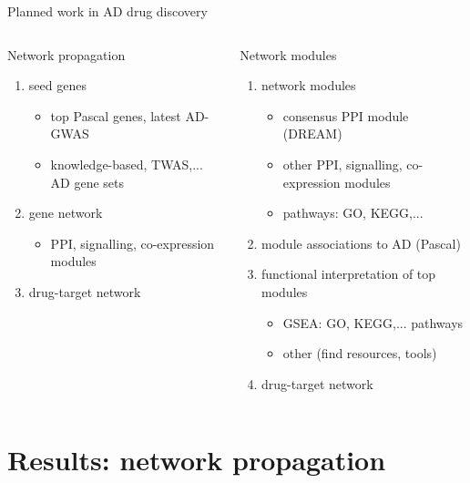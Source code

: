 \documentclass[aspectratio=169]{beamer}
\begin{document}
\begin{frame}[label=plans]{Planned work in AD drug discovery}
\begin{columns}[t]
\begin{column}{0.5\textwidth}
  Network propagation
\begin{enumerate}
  \item seed genes
  \begin{itemize}
    \item \alert{top Pascal genes, latest AD-GWAS}
    \item knowledge-based, TWAS,... AD gene sets
  \end{itemize}
  \item gene network
  \begin{itemize}
    \item PPI, signalling, co-expression modules
  \end{itemize}
  \item drug-target network
\end{enumerate}
\end{column}

\begin{column}{0.5\textwidth}
  Network modules
\begin{enumerate}
  \item network modules
  \begin{itemize}
    \item \alert{consensus PPI module (DREAM)}
    \item other PPI, signalling, co-expression modules
    \item \alert{pathways: GO, KEGG,...}
  \end{itemize}
  \item \alert{module associations to AD (Pascal)}
  \item functional interpretation of top modules
  \begin{itemize}
    \item \alert{GSEA: GO, KEGG,... pathways}
    \item other (find resources, tools)
  \end{itemize}
  \item drug-target network
\end{enumerate}
\end{column}
\end{columns}
\end{frame}

\section{Results: network propagation}
\end{document}
